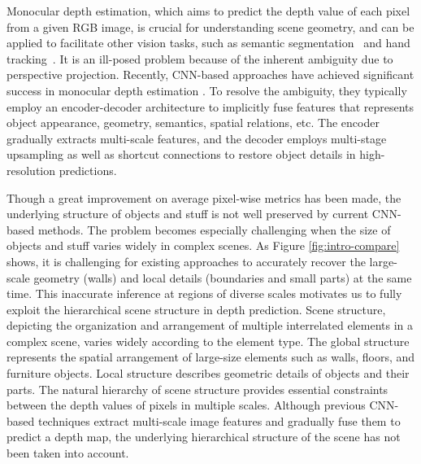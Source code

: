 \documentclass{article}
\begin{document}
Monocular depth estimation, which aims to predict the depth value of each pixel from a given RGB image, is crucial for understanding scene geometry, and can be applied to facilitate other vision tasks, such as semantic segmentation~\cite{park2017rdfnet} and hand tracking~\cite{qian2014realtime}.
It is an ill-posed problem because of the inherent ambiguity due to perspective projection.
Recently, CNN-based approaches have achieved significant success in monocular depth estimation \cite{laina2016deeper,fu2018deep,xu2018structured,hao2018detail,hu2019revisiting}. 
To resolve the ambiguity, they typically employ an encoder-decoder architecture to implicitly fuse features that represents object appearance, geometry, semantics, spatial relations, etc.  
The encoder gradually extracts multi-scale features, and the decoder employs multi-stage upsampling as well as shortcut connections to restore object details in high-resolution predictions. 

Though a great improvement on average pixel-wise metrics has been made, the underlying structure of objects and stuff is not well preserved by current CNN-based methods. 
The problem becomes especially challenging when the size of objects and stuff varies widely in complex scenes.
As Figure \ref{fig:intro-compare} shows, it is challenging for existing approaches to accurately recover the large-scale geometry (walls) and local details (boundaries and small parts) at the same time.
This inaccurate inference at regions of diverse scales motivates us to fully exploit the hierarchical scene structure in depth prediction.
Scene structure, depicting the organization and arrangement of multiple interrelated elements in a complex scene, varies widely according to the element type. 
The global structure represents the spatial arrangement of large-size elements such as walls, floors, and furniture objects. 
Local structure describes geometric details of objects and their parts.
The natural hierarchy of scene structure provides essential constraints between the depth values of pixels in multiple scales. 
Although previous CNN-based techniques extract multi-scale image features and gradually fuse them to predict a depth map, the underlying hierarchical structure of the scene has not been taken into account. 
\end{document}
